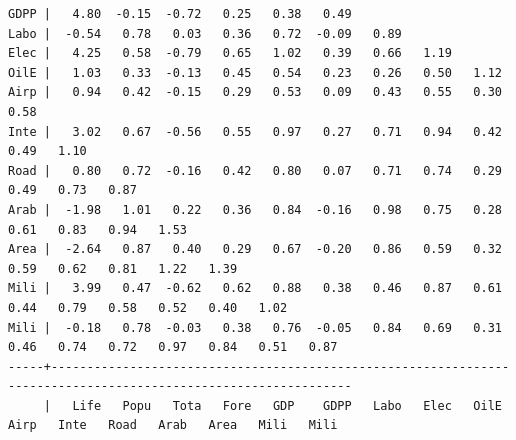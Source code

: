 \documentclass[a4paper,10pt,twocolumn]{article}
\begin{document}
\begin{landscape}
\begin{verbatim}
GDPP |   4.80  -0.15  -0.72   0.25   0.38   0.49
Labo |  -0.54   0.78   0.03   0.36   0.72  -0.09   0.89
Elec |   4.25   0.58  -0.79   0.65   1.02   0.39   0.66   1.19
OilE |   1.03   0.33  -0.13   0.45   0.54   0.23   0.26   0.50   1.12
Airp |   0.94   0.42  -0.15   0.29   0.53   0.09   0.43   0.55   0.30   0.58
Inte |   3.02   0.67  -0.56   0.55   0.97   0.27   0.71   0.94   0.42   0.49   1.10
Road |   0.80   0.72  -0.16   0.42   0.80   0.07   0.71   0.74   0.29   0.49   0.73   0.87
Arab |  -1.98   1.01   0.22   0.36   0.84  -0.16   0.98   0.75   0.28   0.61   0.83   0.94   1.53
Area |  -2.64   0.87   0.40   0.29   0.67  -0.20   0.86   0.59   0.32   0.59   0.62   0.81   1.22   1.39
Mili |   3.99   0.47  -0.62   0.62   0.88   0.38   0.46   0.87   0.61   0.44   0.79   0.58   0.52   0.40   1.02
Mili |  -0.18   0.78  -0.03   0.38   0.76  -0.05   0.84   0.69   0.31   0.46   0.74   0.72   0.97   0.84   0.51   0.87
-----+----------------------------------------------------------------------------------------------------------------
     |   Life   Popu   Tota   Fore   GDP    GDPP   Labo   Elec   OilE   Airp   Inte   Road   Arab   Area   Mili   Mili


\end{verbatim}
\end{landscape}
\end{document}
